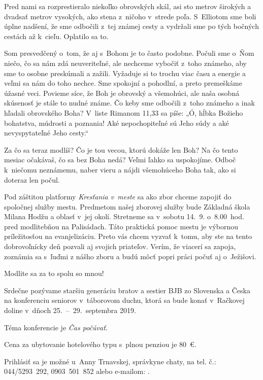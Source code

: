 Pred nami sa rozprestieralo niekoľko obrovských skál, asi sto metrov širokých a dvadsať metrov vysokých, ako stena z~ničoho v~strede poľa. S~Elliotom sme boli úplne nadšení, že sme odbočili z~tej známej cesty a vydržali sme po tých bočných cestách až k~cieľu. Oplatilo sa to.

Som presvedčený o~tom, že aj s~Bohom je to často podobne. Počuli sme o~Ňom niečo, čo sa nám zdá neuveriteľné, ale nechceme vybočiť z~toho známeho, aby sme to osobne preskúmali a zažili. Vyžaduje si to trochu viac času a energie a veľmi sa nám do toho nechce. Sme spokojní a pohodlní, a preto premeškáme úžasné veci. Povieme síce, že Boh je obrovský a všemohúci, ale naša osobná skúsenosť je stále to nudné známe. Čo keby sme odbočili z~toho známeho a inak hľadali obrovského Boha? V~liste Rimanom 11,33 sa píše: „Ó, hĺbka Božieho bohatstva, múdrosti a poznania! Aké nepochopiteľné sú Jeho súdy a aké nevyspytateľné Jeho cesty.“

Za čo sa teraz modlíš? Čo je tou vecou, ktorú dokáže len Boh? Na čo tento mesiac očakávaš, čo sa bez Boha nedá? Veľmi ľahko sa uspokojíme. Odboč k~niečomu neznámemu, naber vieru a nájdi všemohúceho Boha tak, ako si doteraz len počul.



Pod záštitou platformy {\it Kresťania v~meste} sa ako zbor chceme zapojiť do spoločnej služby mestu. Predmetom našej zborovej služby bude Základná škola Milana Hodžu a oblasť v~jej okolí. Stretneme sa v~sobotu 14.~9. o~8.00~hod. pred modlitebňou na Palisádach. Táto praktická pomoc mestu je výbornou príležitosťou na evanjelizáciu. Preto vás chcem vyzvať k~tomu, aby ste na tento dobrovoľnícky deň pozvali aj svojich priateľov. Verím, že viacerí sa zapoja, zoznámia sa s~ľuďmi z nášho zboru a budú môcť popri práci počuť aj o~Ježišovi.

Modlite sa za to spolu so mnou!



Srdečne pozývame staršiu generáciu bratov a sestier BJB zo Slovenska a Česka na konferenciu seniorov v~táborovom duchu, ktorá sa bude konať v~Račkovej doline v~dňoch 25.~--~29.~septembra 2019.

Téma konferencie je {\it Čas počúvať}.

Cena za ubytovanie hotelového typu s~plnou penziou je 80~€.

Prihlásiť sa je možné u~Anny Trnavskej, správkyne chaty, na tel. č.: 044/5293~292, 0903~501~852 alebo e-mailom: .


